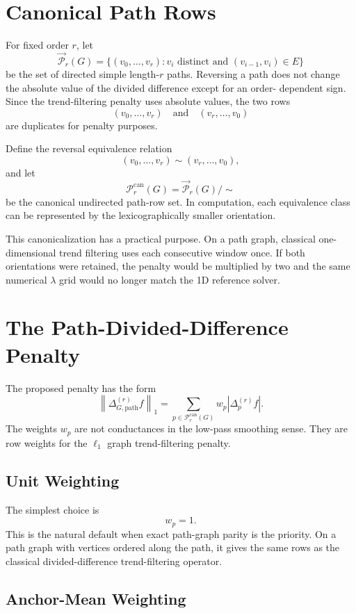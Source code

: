 \documentclass[11pt]{article}
\newcommand{\norm}[1]{\left\lVert #1 \right\rVert}
\newcommand{\Path}{\mathcal P}
\begin{document}
\section{Canonical Path Rows}

For fixed order \(r\), let
\[
  \overrightarrow{\Path}_r(G)
  =
  \{(v_0,\ldots,v_r): v_i \text{ distinct and } (v_{i-1},v_i)\in E\}
\]
be the set of directed simple length-\(r\) paths.  Reversing a path does not
change the absolute value of the divided difference except for an order-
dependent sign.  Since the trend-filtering penalty uses absolute values, the
two rows
\[
  (v_0,\ldots,v_r)
  \quad\text{and}\quad
  (v_r,\ldots,v_0)
\]
are duplicates for penalty purposes.

Define the reversal equivalence relation
\[
  (v_0,\ldots,v_r)\sim(v_r,\ldots,v_0),
\]
and let
\[
  \Path_r^{\mathrm{can}}(G)
  =
  \overrightarrow{\Path}_r(G)/{\sim}
\]
be the canonical undirected path-row set.  In computation, each equivalence
class can be represented by the lexicographically smaller orientation.

This canonicalization has a practical purpose.  On a path graph, classical
one-dimensional trend filtering uses each consecutive window once.  If both
orientations were retained, the penalty would be multiplied by two and the
same numerical \(\lambda\) grid would no longer match the 1D reference solver.

\section{The Path-Divided-Difference Penalty}

The proposed penalty has the form
\[
  \norm{\Delta^{(r)}_{G,\mathrm{path}}f}_1
  =
  \sum_{p\in \Path_r^{\mathrm{can}}(G)}
  w_p
  \left|\Delta^{(r)}_p f\right|.
\]
The weights \(w_p\) are not conductances in the low-pass smoothing sense.
They are row weights for the \(\ell_1\) graph trend-filtering penalty.

\subsection{Unit Weighting}

The simplest choice is
\[
  w_p=1.
\]
This is the natural default when exact path-graph parity is the priority.
On a path graph with vertices ordered along the path, it gives the same rows
as the classical divided-difference trend-filtering operator.

\subsection{Anchor-Mean Weighting}
\end{document}
